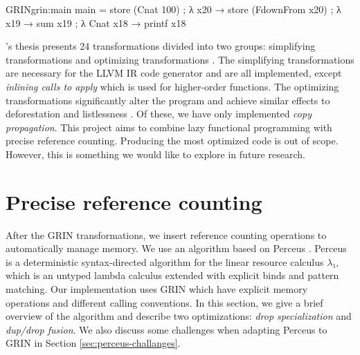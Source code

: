 \documentclass[9pt, twocolumn]{article}
\begin{document}
\begin{typewriter}[left]{GRIN}{grin:main}
main =
  store (Cnat 100) ; λ x20 →
  store (FdownFrom x20) ; λ x19 →
  sum x19 ; λ Cnat x18 →
  printf x18
\end{typewriter}

\citeauthor{boquist1999}'s thesis presents 24 transformations divided into two groups: simplifying transformations and optimizing 
transformations \citep{boquist1999}. 
The simplifying transformations are necessary for the LLVM IR code generator and are all implemented, except \emph{inlining calls to apply}
which is used for higher-order functions. 
The optimizing transformations significantly alter the program and achieve similar effects to deforestation \citep{wadler1988} and listlessness \citep{wadler1984}.
Of these, we have only implemented \emph{copy propagation}.
This project aims to combine lazy functional programming with precise reference counting. 
Producing the most optimized code is out of scope. 
However, this is something we would like to explore in future research.

\section{Precise reference counting}
\label{sec:precise}
After the GRIN transformations, we insert reference counting operations to automatically manage memory.
We use an algorithm based on Perceus \citep{reinking2021}. 
Perceus is a deterministic syntax-directed algorithm for the linear resource calculus $λ₁$, which is an untyped lambda calculus extended with explicit binds and pattern matching.
Our implementation uses GRIN which have explicit memory operations and different calling conventions.
In this section, we give a brief overview of the algorithm and describe two optimizations: \emph{drop specialization} and \emph{dup/drop fusion}.
We also discuss some challenges when adapting Perceus to GRIN in Section \ref{sec:perceus-challanges}. 
\end{document}
